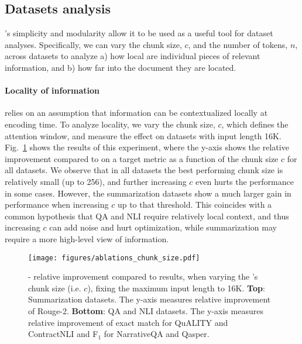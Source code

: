 \subsection{Datasets analysis}
\sled{}'s simplicity and modularity allow it to be used as a useful tool for dataset analyses. Specifically, we can vary the chunk size, $c$, and the number of tokens, $n$, across datasets to analyze a) how local are individual pieces of relevant information, and b) 
how far into the document they are located.

\label{subsec:properties}
\paragraph{Locality of information}
\sled{} relies on an assumption that information can be contextualized locally at encoding time. To analyze locality, we vary the chunk size, $c$, which defines the attention window, and measure
the effect on \SCROLLS{} datasets with input length 16K. 
Fig.~\ref{fig:ab-chunk} shows the results of this experiment, where the y-axis shows the relative improvement compared to \bartbase{} on a target metric as a function of the chunk size $c$ for all datasets.
We observe that in all datasets the best performing chunk size is relatively small (up to 256), and further increasing $c$ even hurts the performance in some cases. However, the summarization datasets show a much larger gain in performance when increasing $c$ up to that threshold.
This coincides with a common hypothesis that QA and NLI require relatively local context, and thus increasing $c$ can add noise and hurt optimization, while summarization may require a more high-level view of information.



\begin{figure}[t]
\begin{center}


\centerline{
\texttt{[image: figures/ablations\_chunk\_size.pdf]}
}
\setlength{\belowcaptionskip}{-20pt}
\caption{\bartbase{}-\sled{} relative improvement compared to \bartbase{} results, when varying the \sled{}'s chunk size (i.e. $c$), fixing the maximum input length to 16K. \textbf{Top}: Summarization datasets. The y-axis measures relative improvement of Rouge-2. \textbf{Bottom}: QA and NLI datasets. The y-axis measures relative improvement of exact match for QuALITY and ContractNLI and F$_1$ for NarrativeQA and Qasper.
}
 
\label{fig:ab-chunk}
\end{center}
\end{figure} 
